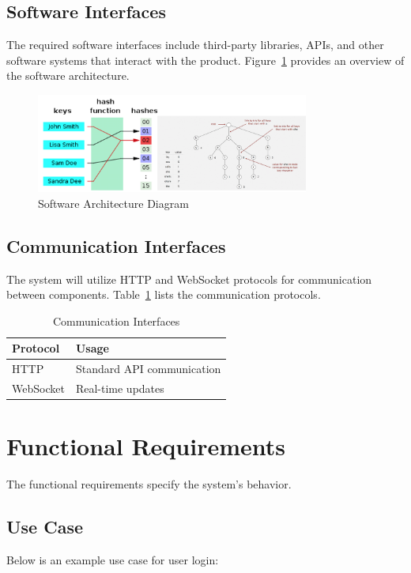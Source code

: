 \subsection{Software Interfaces}
The required software interfaces include third-party libraries, APIs, and other software systems that interact with the product. Figure~\ref{fig:software_architecture} provides an overview of the software architecture.

\begin{figure}[h]
    \centering
    \includegraphics[width=0.8\textwidth]{images/hashing.png}
    \caption{Software Architecture Diagram}
    \label{fig:software_architecture}
\end{figure}

\subsection{Communication Interfaces}
The system will utilize HTTP and WebSocket protocols for communication between components. Table~\ref{tab:communication_interfaces} lists the communication protocols.

\begin{table}[h]
    \centering
    \begin{tabular}{|l|l|}
        \hline
        \textbf{Protocol} & \textbf{Usage} \\ \hline
        HTTP & Standard API communication \\ \hline
        WebSocket & Real-time updates \\ \hline
    \end{tabular}
    \caption{Communication Interfaces}
    \label{tab:communication_interfaces}
\end{table}

\section{Functional Requirements}
The functional requirements specify the system's behavior.

\subsection{Use Case}
Below is an example use case for user login:

